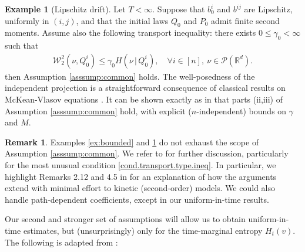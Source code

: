 \documentclass[11pt,reqno]{amsart}
\numberwithin{equation}{section}
\theoremstyle{definition}
\newtheorem{example}[theorem]{Example}\newtheorem{definition}[theorem]{Definition}
\newtheorem{remark}[theorem]{Remark}
\def\P{{\mathcal P}}
\def\R{{\mathbb R}}
\def\W{{\mathcal W}}
\begin{document}
\begin{example}[Lipschitz drift] \label{ex:lipschitz}
Let $T < \infty$.
Suppose that $b_0^i$ and $b^{ij}$ are Lipschitz, uniformly in $(i,j)$, and that the initial laws $Q_0$ and $P_0$ admit finite second moments. Assume also the following transport inequality: there exists $0 \le \gamma_0 < \infty$ such that
\begin{align*}
\W_2^2(\nu,Q^i_0) \le \gamma_0 H(\nu\,|\,Q^i_0), \quad \forall i \in [n], \ \nu \in \P(\R^d).
\end{align*}
then Assumption \ref{asssump:common} holds. The well-posedness of the independent projection is a straightforward consequence of classical results on McKean-Vlasov equations \cite[Proposition 4.1]{lacker2023independent}. It can be shown exactly as in \cite[Corollary 2.7]{lacker2022hierarchies} that parts (ii,iii) of Assumption \ref{asssump:common} hold, with explicit ($n$-independent) bounds on $\gamma$ and $M$.
\end{example}



\begin{remark}
Examples \ref{ex:bounded} and \ref{ex:lipschitz} do not exhaust the scope of Assumption \ref{asssump:common}. We refer to  \cite[Section 2B]{lacker2022hierarchies} for further discussion, particularly for the most unusual condition \eqref{cond.transport.type.ineq}. In particular, we highlight Remarks 2.12 and 4.5 in \cite{lacker2023sharp} for an explanation of how the arguments extend with minimal effort to kinetic (second-order) models. We could also handle path-dependent coefficients, except in our uniform-in-time results.
\end{remark}

Our second and stronger set of assumptions will allow us to obtain uniform-in-time estimates, but (unsurprisingly) only for the time-marginal entropy $H_t(v)$. The following is adapted from \cite{lacker2023sharp}:
\end{document}

